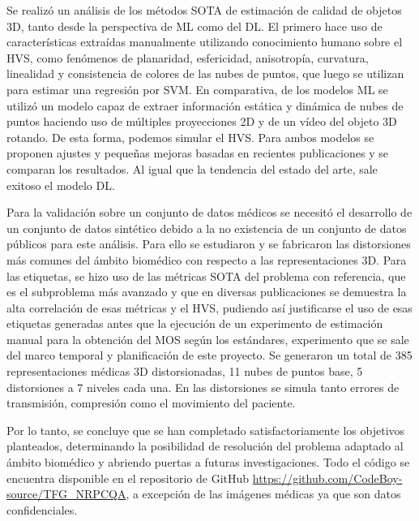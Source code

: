 Se realizó un análisis de los métodos SOTA de estimación de calidad de objetos 
3D, tanto desde la perspectiva de ML como del DL. El primero hace uso de características 
extraídas manualmente utilizando conocimiento humano sobre el HVS, como fenómenos 
de planaridad, esfericidad, anisotropía, curvatura, linealidad y consistencia de 
colores de las nubes de puntos, que luego se utilizan para estimar una regresión por 
SVM. En comparativa, de los modelos ML se utilizó un modelo capaz de extraer 
información estática y dinámica de nubes de puntos haciendo uso de múltiples 
proyecciones 2D y de un vídeo del objeto 3D rotando. De esta forma, podemos 
simular el HVS. Para ambos modelos se proponen ajustes y pequeñas mejoras basadas 
en recientes publicaciones y se comparan los resultados. 
Al igual que la tendencia del estado del arte, sale exitoso el modelo DL. 

Para la validación sobre un conjunto de datos médicos se necesitó el desarrollo 
de un conjunto de datos sintético debido a la no existencia de un conjunto de 
datos públicos para este análisis. Para ello se estudiaron y se fabricaron las distorsiones más 
comunes del ámbito biomédico con respecto a las representaciones 3D. Para las etiquetas, 
se hizo uso de las métricas SOTA del problema con referencia, que es el subproblema 
más avanzado y que en diversas publicaciones se demuestra la alta correlación 
de esas métricas y el HVS, pudiendo así justificarse el uso de esas 
etiquetas generadas antes que la ejecución de un experimento de estimación 
manual para la obtención del MOS según los estándares, experimento que se 
sale del marco temporal y planificación de este proyecto. Se generaron 
un total de 385 representaciones médicas 3D distorsionadas, 11 nubes de puntos 
base, 5 distorsiones a 7 niveles cada una. En las distorsiones se simula 
tanto errores de transmisión, compresión como el movimiento del paciente.


Por lo tanto, se concluye que se han completado satisfactoriamente los objetivos 
planteados, determinando la posibilidad de resolución del problema adaptado 
al ámbito biomédico y abriendo puertas a futuras investigaciones. Todo el código
se encuentra disponible en el repositorio de GitHub \url{https://github.com/CodeBoy-source/TFG_NRPCQA},
a excepción de las imágenes médicas ya que son datos confidenciales.

